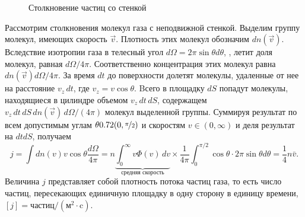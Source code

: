 \begin{wrapfigure}[9]{r}{0.35\tw}
\centering
\vspace{-1pc}
\caption{Столкновение частиц со стенкой}
\label{pic:maxwell-mean-particle-collision}
\end{wrapfigure}
Рассмотрим столкновения молекул газа с неподвижной стенкой. Выделим группу молекул, имеющих скорость $\vec v$. Плотность этих молекул обозначим $d n(\vec{v})$. Вследствие изотропии газа в телесный угол $d \Omega = 2 \pi \sin \theta d \theta$, , летит доля молекул, равная $d \Omega / 4 \pi$. Соответственно концентрация этих молекул равна $dn(\vec{v}) d \Omega / 4 \pi$. За время $dt$ до поверхности долетят молекулы, удаленные от нее на расстояние $v_z \, dt$, где $v_z = v \cos \theta$. Bсего в площадку $dS$ попадут молекулы, находящиеся в цилиндре объемом $v_z \, dt \, dS$, содержащем $v_z \, dt \, dS \, dn(\vec{v}) \, d\Omega / (4 \pi)$ молекул выделенной группы. Суммируя результат по всем допустимым углам $\theta \in (0, \nicefrac{\pi}{2})$ и скоростям $v \in (0, \infty)$ и деля результат на $d t d S$, получаем
\begin{equation}
j=\int d n(v) v \cos \theta \frac{d \Omega}{4 \pi}=n \underbrace{\int_0^{\infty} v \Phi(v) \, d v}_{\text{средняя скорость}} \times \frac{1}{4 \pi} \int_0^{\pi / 2} \cos \theta \cdot 2 \pi \sin \theta d \theta=\frac{1}{4} n \bar{v} .
\label{eq:mean-count-mxwl}
\end{equation}
Величина $j$ представляет собой плотность потока частиц газа, то есть число частиц, пересекающих единичную площадку в одну сторону в единицу времени, $[j]= \text{частиц}/\left(\text{м}^2 \cdot \text{c}\right)$.

